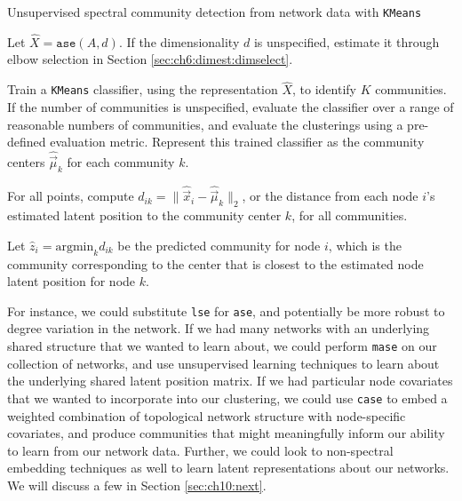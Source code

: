 \begin{algorithm}[h]
\caption{Unsupervised  spectral community detection from network data with \texttt{KMeans}}
\label{alg:ch7:sc}
\SetAlgoLined

Let $\hat X = \texttt{ase}(A, d)$. If the dimensionality $d$ is unspecified, estimate it through elbow selection in Section \ref{sec:ch6:dimest:dimselect}.

Train a \texttt{KMeans} classifier, using the representation $\hat X$, to identify $K$ communities. If the number of communities is unspecified, evaluate the classifier over a range of reasonable numbers of communities, and evaluate the clusterings using a pre-defined evaluation metric. Represent this trained classifier as the community centers $\hat{\vec \mu}_k$ for each community $k$. 

For all points, compute $d_{ik} = \|\hat{\vec x}_i - \hat{\vec \mu}_k\|_2$, or the distance from each node $i$'s estimated latent position to the community center $k$, for all communities.

Let $\hat z_i = \text{argmin}_k d_{ik}$ be the predicted community for node $i$, which is the community corresponding to the center that is closest to the estimated node latent position for node $k$.

\end{algorithm}

For instance, we could substitute \texttt{lse} for \texttt{ase}, and potentially be more robust to degree variation in the network. If we had many networks with an underlying shared structure that we wanted to learn about, we could perform \texttt{mase} on our collection of networks, and use unsupervised learning techniques to learn about the underlying shared latent position matrix. If we had particular node covariates that we wanted to incorporate into our clustering, we could use \texttt{case} to embed a weighted combination of topological network structure with node-specific covariates, and produce communities that might meaningfully inform our ability to learn from our network data. Further, we could look to non-spectral embedding techniques as well to learn latent representations about our networks. We will discuss a few in Section \ref{sec:ch10:next}.

